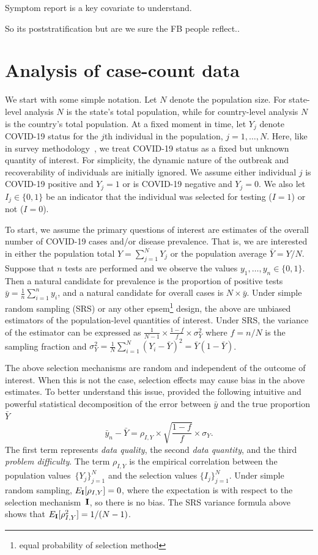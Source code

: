 \documentclass[11pt]{amsart}
\def\I{\bf I}
\begin{document}
Symptom report is a key covariate to understand.

So its poststratification but are we sure the FB people reflect..



\section{Analysis of case-count data}
\label{section:casecount}

We start with some simple notation.  Let $N$ denote the population size.  For state-level analysis $N$ is the state's total population, while for country-level analysis $N$ is the country's total population.  At a fixed moment in time, let $Y_j$ denote COVID-19 status for the $j$th individual in the population, $j=1,\ldots, N$. Here, like in survey methodology~\citep{Cochran77}, we treat COVID-19 status as a fixed but unknown quantity of interest. For simplicity, the dynamic nature of the outbreak and recoverability of individuals are initially ignored.  We assume either individual $j$ is COVID-19 positive and $Y_j=1$ or is COVID-19 negative and $Y_j=0$. We also let $I_j \in \{0,1\}$ be an indicator that the individual was selected for testing ($I = 1$) or not ($I=0$).

To start, we assume the primary questions of interest are estimates of the overall number of COVID-19 cases and/or disease prevalence. That is, we are interested in either the population total $Y = \sum_{j=1}^N Y_j$ or the population average $\bar Y = Y/N$. Suppose that $n$ tests are performed and we observe the values $y_1, \ldots, y_n \in \{0,1\}$.  Then a natural candidate for prevalence is the proportion of positive tests $\bar y = \frac{1}{n} \sum_{i=1}^n y_i$, and a natural candidate for overall cases is $N \times \bar y$.
Under simple random sampling (SRS) or any other epsem\footnote{equal probability of selection method} design, the above are unbiased estimators of the population-level quantities of interest.  Under SRS, the variance of the estimator can be expressed as $\frac{1}{N-1} \times \frac{1-f}{f} \times \sigma_Y^2$ where $f = n/N$ is the sampling fraction and $\sigma_Y^2 = \frac{1}{N} \sum_{i=1}^N (Y_i - \bar Y)^2 = \bar Y (1- \bar Y)$.

The above selection mechanisms are random and independent of the outcome of interest. When this is not the case, selection effects may cause bias in the above estimates. To better understand this issue, \cite{Meng2018} provided the following intuitive and powerful statistical decomposition of the error between $\bar y$ and the true proportion $\bar Y$
$$
\bar y_n - \bar Y =  \rho_{I, Y} \times \sqrt{\frac{1-f}{f}} \times \sigma_Y.
$$
The first term represents \emph{data quality}, the second \emph{data quantity}, and the third \emph{problem difficulty}. The term $\rho_{I,Y}$ is the empirical correlation between the population values~$\{ Y_j \}_{j=1}^N$ and the selection values $\{ I_j \}_{j=1}^N$.  Under simple random sampling, $E_{\I} [ \rho_{I,Y} ] = 0$, where the expectation is with respect to the selection mechanism~$\I$, so there is no bias.  The SRS variance formula above shows that $E_{\I} [ \rho_{I,Y}^2 ]  = 1/(N-1)$.
\end{document}
